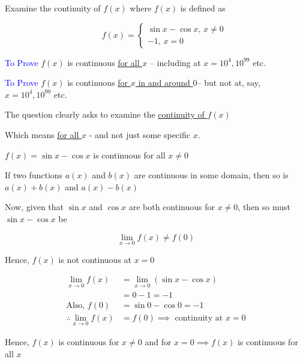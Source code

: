 \documentclass[14pt,fleqn]{extarticle}
\begin{document}
Examine the continuity of $f(x)$
where $f(x)$ is defined as 

%
\[\qquad f(x) = \begin{cases}
  \sin x - \cos x,\, x\neq 0 \\ 
  -1, \, x = 0 
\end{cases} \]


\newcard

\textcolor{blue}{To Prove}\newline 
$f(x)$ is continuous \underline{for all $x$} -- including at $x = 10^4, 10^{99}$ etc.

\newcard

\textcolor{blue}{To Prove}\newline 
$f(x)$ is continuous \underline{for $x$ in and around $0$}\newline --
but not at, say, $x = 10^4, 10^{99}$ etc.

\newcard 

The question clearly asks to examine
the \underline{continuity of $f(x)$}\newline 

Which means \underline{for all $x$} - and not
just some specific $x$.
%

\newcard

$f(x) = \sin x-\cos x$ is continuous 
for all $x\neq 0$ 
%

\newcard

If two functions $a(x)$ and $b(x)$ are
continuous in some domain, then 
so is $a(x) + b(x)$ and $a(x) - b(x)$\newline 

Now, given that $\sin x$ and $\cos x$ 
are both continuous for $x\neq 0$, 
then so must $\sin x-\cos x$ be
%

\newcard

\[ \lim_{x\to 0} f(x) \neq f(0) \]

Hence, $f(x)$ is 
not continuous at $x = 0$
%

\newcard

\begin{align}
\lim_{x\to 0} f(x) &= \lim_{x\to 0}(\sin x-\cos x) \\
&= 0 - 1 = -1 \\
\text{Also, } f(0) &= \sin 0 -\cos 0 = - 1 \\
\therefore \lim_{x\to 0} f(x) &= f(0)\implies\text{ continuity at }x=0
\end{align}


Hence, $f(x)$ is continuous for 
$x\neq 0$ and for $x= 0 \implies f(x)$ 
is continuous for all $x$
\end{document}
